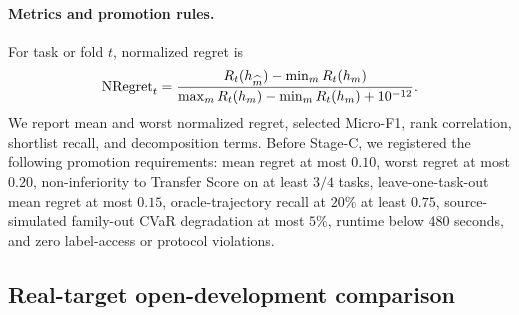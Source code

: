 \paragraph{Metrics and promotion rules.}
For task or fold $t$, normalized regret is
\begin{equation}
  \operatorname{NRegret}_t=
  \frac{R_t(h_{\widehat m})-\min_m R_t(h_m)}
  {\max_m R_t(h_m)-\min_m R_t(h_m)+10^{-12}}.
  \label{eq:nregret}
\end{equation}
We report mean and worst normalized regret, selected Micro-F1, rank
correlation, shortlist recall, and decomposition terms. Before Stage-C, we
registered the following promotion requirements: mean regret at most $0.10$,
worst regret at most $0.20$, non-inferiority to Transfer Score on at least
$3/4$ tasks, leave-one-task-out mean regret at most $0.15$, oracle-trajectory
recall at $20\%$ at least $0.75$, source-simulated family-out CVaR degradation
at most $5\%$, runtime below 480 seconds, and zero label-access or protocol
violations.

\subsection{Real-target open-development comparison}

